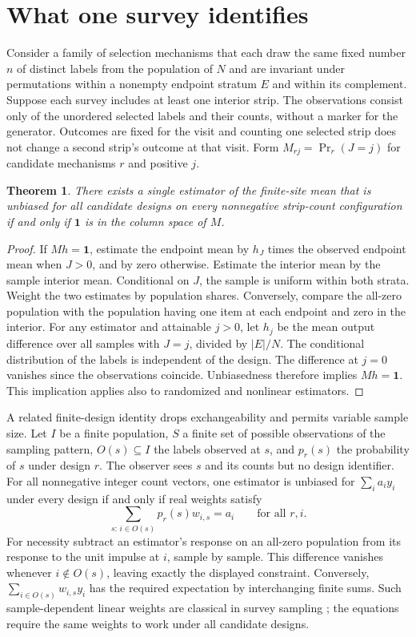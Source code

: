 \documentclass[10pt]{article}
\newtheorem{theorem}{Theorem}
\begin{document}
\section{What one survey identifies}
Consider a family of selection mechanisms that each draw the same fixed number $n$ of distinct labels from the population of $N$ and are invariant under permutations within a nonempty endpoint stratum $E$ and within its complement. Suppose each survey includes at least one interior strip. The observations consist only of the unordered selected labels and their counts, without a marker for the generator. Outcomes are fixed for the visit and counting one selected strip does not change a second strip's outcome at that visit. Form $M_{rj}=\Pr_r(J=j)$ for candidate mechanisms $r$ and positive $j$.

\begin{theorem}
There exists a single estimator of the finite-site mean that is unbiased for all candidate designs on every nonnegative strip-count configuration if and only if $\mathbf1$ is in the column space of $M$.
\end{theorem}
\begin{proof}
If $Mh=\mathbf1$, estimate the endpoint mean by $h_J$ times the observed endpoint mean when $J>0$, and by zero otherwise. Estimate the interior mean by the sample interior mean. Conditional on $J$, the sample is uniform within both strata. Weight the two estimates by population shares. Conversely, compare the all-zero population with the population having one item at each endpoint and zero in the interior. For any estimator and attainable $j>0$, let $h_j$ be the mean output difference over all samples with $J=j$, divided by $|E|/N$. The conditional distribution of the labels is independent of the design. The difference at $j=0$ vanishes since the observations coincide. Unbiasedness therefore implies $Mh=\mathbf1$. This implication applies also to randomized and nonlinear estimators.
\end{proof}

A related finite-design identity drops exchangeability and permits variable sample size. Let $I$ be a finite population, $S$ a finite set of possible observations of the sampling pattern, $O(s)\subseteq I$ the labels observed at $s$, and $p_r(s)$ the probability of $s$ under design $r$. The observer sees $s$ and its counts but no design identifier. For all nonnegative integer count vectors, one estimator is unbiased for $\sum_i a_i y_i$ under every design if and only if real weights satisfy
\[
  \sum_{s:\,i\in O(s)}p_r(s)w_{i,s}=a_i \qquad\text{for all }r,i.
\]
For necessity subtract an estimator's response on an all-zero population from its response to the unit impulse at $i$, sample by sample. This difference vanishes whenever $i\notin O(s)$, leaving exactly the displayed constraint. Conversely, $\sum_{i\in O(s)}w_{i,s}y_i$ has the required expectation by interchanging finite sums. Such sample-dependent linear weights are classical in survey sampling \cite{godambe}; the equations require the same weights to work under all candidate designs.
\end{document}
